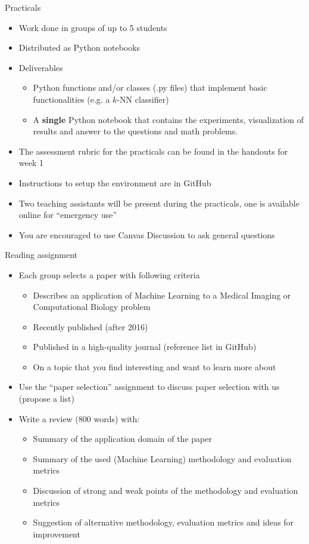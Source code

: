 \documentclass[notes]{beamer}          %
\begin{document}
\begin{frame}{Practicals}
\begin{itemize}
    \item Work done in groups of up to 5 students
    \item Distributed as Python notebooks
    \item Deliverables
    \begin{itemize}
        \item Python functions and/or classes (.py files) that implement basic functionalities (e.g. a $k$-NN classifier)
        \item A \textbf{single} Python notebook that contains the experiments, visualization of results and answer to the questions and math problems.
    \end{itemize}
    \item The assessment rubric for the practicals can be found in the handouts for week 1
    \item Instructions to setup the environment are in GitHub
    \item Two teaching assistants will be present during the practicals, one is available online for ``emergency use''
    	\item You are encouraged to use Canvas Discussion to ask general questions
\end{itemize}    
\end{frame}

\begin{frame}{Reading assignment}
\begin{itemize}
    \item Each group selects a paper with following criteria
    \begin{itemize}
        \item Describes an application of Machine Learning to a Medical Imaging or Computational Biology problem
		\item Recently published (after 2016)
		\item Published in a high-quality journal (reference list in GitHub)
		\item	 On a topic that you find interesting and want to learn more about
    \end{itemize}
    \item Use the ``paper selection'' assignment to discuss paper selection with us (propose a list)
    \item Write a review (800 words) with:
    \begin{itemize}
    		\item Summary of the application domain of the paper
    		\item Summary of the used (Machine Learning) methodology and evaluation metrics
		\item Discussion of strong and weak points of the methodology and evaluation metrics
		\item Suggestion of alternative methodology, evaluation metrics and ideas for improvement
    \end{itemize}
\end{itemize}    
\end{frame}
\end{document}
